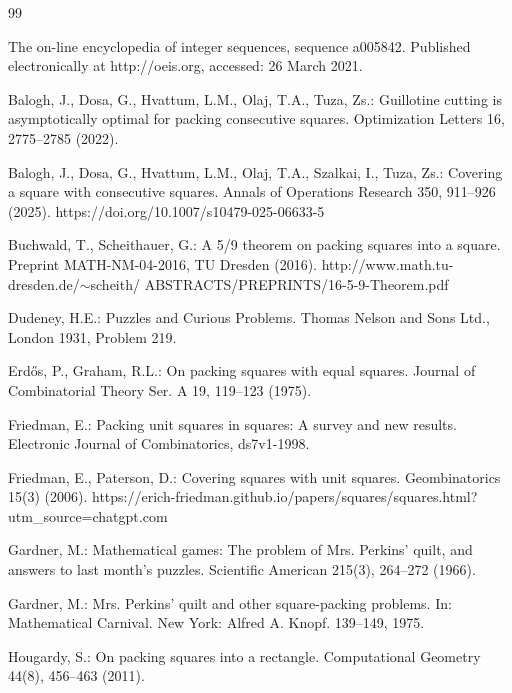 \documentclass[twoside]{amsart}
\begin{document}
\begin{thebibliography}{99}

The on-line encyclopedia of integer sequences, sequence a005842.
Published electronically at http://oeis.org, accessed: 26 March 2021.

Balogh, J., Dosa, G., Hvattum, L.M., Olaj, T.A., Tuza, Zs.: Guillotine
cutting is asymptotically optimal for packing consecutive squares. Optimization Letters
16, 2775--2785 (2022).

Balogh, J., Dosa, G., Hvattum, L.M., Olaj, T.A., Szalkai, I., Tuza, Zs.: Covering a
square with consecutive squares. Annals of Operations Research 350, 911--926 (2025). https://doi.org/10.1007/s10479-025-06633-5

Buchwald, T., Scheithauer, G.: A 5/9 theorem on packing
squares into a square. Preprint MATH-NM-04-2016, TU Dresden (2016).
http://www.math.tu-dresden.de/$\sim$scheith/ ABSTRACTS/PREPRINTS/16-5-9-Theorem.pdf

Dudeney, H.E.: Puzzles and Curious Problems. Thomas Nelson
and Sons Ltd., London 1931, Problem 219.

 Erd\H{o}s, P., Graham, R.L.: On packing squares with equal
squares. Journal of Combinatorial Theory Ser. A 19, 119--123 (1975).

Friedman, E.: Packing unit squares in squares: A survey
and new results. Electronic Journal of Combinatorics, ds7v1-1998.

Friedman, E., Paterson, D.: Covering squares with unit squares.
Geombinatorics 15(3)
(2006). https://erich-friedman.github.io/papers/squares/squares.html?utm\_source=chatgpt.com

Gardner, M.: Mathematical games: The problem of Mrs.
Perkins' quilt, and answers to last month's puzzles. Scientific American
215(3), 264--272 (1966).

Gardner, M.: Mrs. Perkins' quilt and other square-packing
problems. In: Mathematical Carnival. New York: Alfred A. Knopf. 139--149, 1975.


Hougardy, S.: On packing squares into a rectangle.
Computational Geometry 44(8), 456--463 (2011).


\end{thebibliography}
\end{document}

